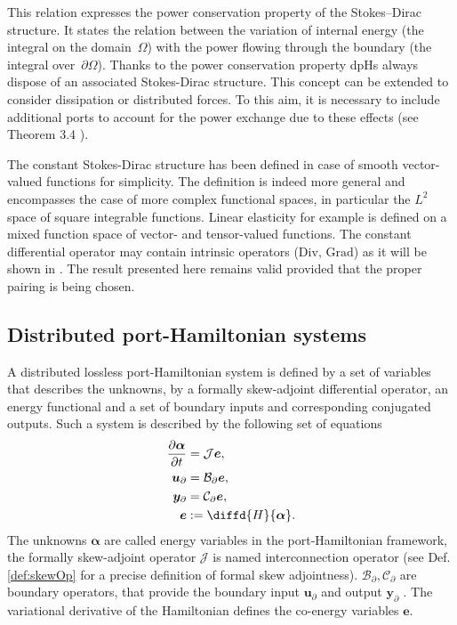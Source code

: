 This  relation expresses the  power  conservation property of the Stokes–Dirac structure. It states the relation between the variation of internal energy (the integral on the domain~$\Omega$) with the power flowing through the boundary (the integral over~$\partial\Omega$). Thanks to the power conservation property dpHs always dispose of an associated Stokes-Dirac structure. This concept can be extended to consider dissipation or distributed forces. To this aim, it is necessary to include additional ports to account for the power exchange due to these effects (see Theorem 3.4 \cite{macchelli2004modelling}). 


\begin{remark}
	The constant Stokes-Dirac structure has been defined in case of smooth vector-valued functions for simplicity.  The definition is indeed more general and encompasses the case of more complex functional spaces, in particular the $L^2$ space of square integrable functions.  Linear elasticity for example is defined on a mixed function space of vector- and tensor-valued functions. The constant differential operator may contain intrinsic operators ($\mathrm{Div}, \, \mathrm{Grad}$) as it will be shown in . The result presented here remains valid provided that the proper {pairing is being chosen}. 
\end{remark}


\subsection{Distributed port-Hamiltonian systems}

A distributed lossless port-Hamiltonian system is defined by a set of variables that describes the unknowns, by a formally skew-adjoint differential operator, an energy functional and a set of boundary inputs and corresponding conjugated outputs. Such a system is described by the following set of equations
\begin{equation}\label{eq:phsys}
\begin{aligned}
\diffp{\bm{\alpha}}{t} &= \mathcal{J}\displaystyle \bm{e}, \vspace{3pt}\\
\bm{u}_\partial &= \mathcal{B}_\partial  \displaystyle \bm{e}, \vspace{3pt}\\
\bm{y}_\partial &= \mathcal{C}_\partial \displaystyle \bm{e}, \vspace{3pt}\\
\bm{e} &:= \displaystyle \diffd{H}{\bm{\alpha}}.
\end{aligned}
\end{equation}
The unknowns $\bm{\alpha}$ are called energy variables in the port-Hamiltonian framework, the formally skew-adjoint operator $\mathcal{J}$ is named interconnection operator (see Def. \ref{def:skewOp} for a precise definition of formal skew adjointness). $\mathcal{B}_\partial, \mathcal{C}_\partial$ are boundary operators, that provide the boundary input $\bm{u}_\partial$ and output $\bm{y}_\partial$ \cite[Chapter 4]{tucsnak2009observation}. The variational derivative of the Hamiltonian defines the co-energy variables $\bm{e}$.


